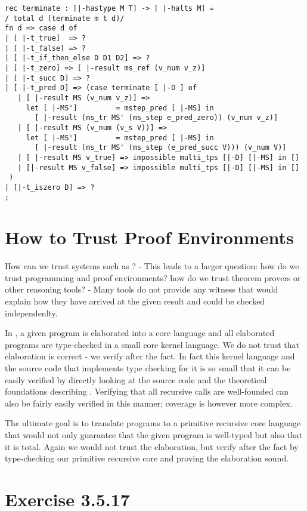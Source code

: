 \begin{lstlisting}
rec terminate : [|-hastype M T] -> [ |-halts M] =
/ total d (terminate m t d)/
fn d => case d of
| [ |-t_true]  => ?
| [ |-t_false] => ?
| [ |-t_if_then_else D D1 D2] => ?
| [ |-t_zero] => [ |-result ms_ref (v_num v_z)]
| [ |-t_succ D] => ?
| [ |-t_pred D] => (case terminate [ |-D ] of
   | [ |-result MS (v_num v_z)] =>
     let [ |-MS']         = mstep_pred [ |-MS] in
       [ |-result (ms_tr MS' (ms_step e_pred_zero)) (v_num v_z)]
   | [ |-result MS (v_num (v_s V))] =>
     let [ |-MS']         = mstep_pred [ |-MS] in
       [ |-result (ms_tr MS' (ms_step (e_pred_succ V))) (v_num V)]
   | [ |-result MS v_true] => impossible multi_tps [|-D] [|-MS] in []
   | [|-result MS v_false] => impossible multi_tps [|-D] [|-MS] in []
 )
| [|-t_iszero D] => ?
;
\end{lstlisting}



\section{How to Trust Proof Environments}
How can we trust systems such as \beluga? - This leads to a larger question: how do we trust programming and proof environments? how do we trust theorem provers or other reasoning tools? - Many tools do not provide any witness that would explain how they have arrived at the given result and could be checked independenlty.

In \beluga, a given program is elaborated into a core language and all elaborated programs are type-checked in a small core kernel language. We do not trust that elaboration is correct - we verify after the fact. In fact this kernel language and the source code that implements type checking for it is so small that it can be easily verified by directly looking at the source code and the theoretical foundations describing \beluga. Verifying that all recursive calls are well-founded can also be fairly easily verified in this manner; coverage is however more complex.

The ultimate goal is to translate \beluga programs to a primitive recursive core language that would not only guarantee that the given program is well-typed but also that it is total. Again we would not trust the elaboration, but verify after the fact by type-checking our primitive recursive core and proving the elaboration sound.



\section{Exercise 3.5.17}

